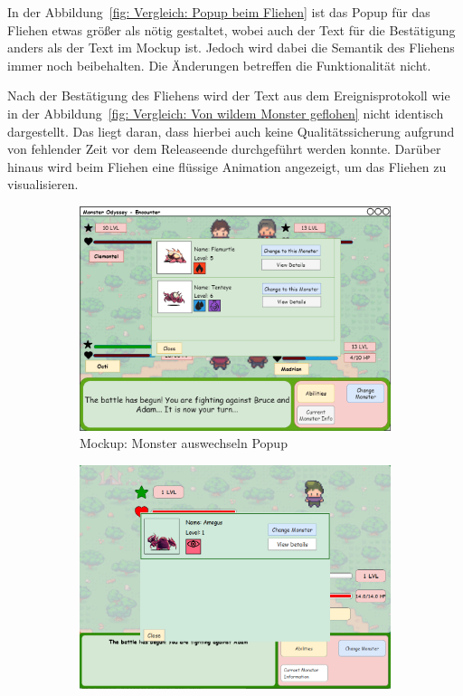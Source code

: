 In der Abbildung~\ref{fig: Vergleich: Popup beim Fliehen} ist das Popup für das Fliehen etwas größer als nötig gestaltet, wobei auch der Text für die Bestätigung anders als der Text im Mockup ist. Jedoch wird dabei die Semantik des Fliehens immer noch beibehalten. Die Änderungen betreffen die Funktionalität nicht.

Nach der Bestätigung des Fliehens wird der Text aus dem Ereignisprotokoll wie in der Abbildung~\ref{fig: Vergleich: Von wildem Monster geflohen} nicht identisch dargestellt. Das liegt daran, dass hierbei auch keine Qualitätssicherung aufgrund von fehlender Zeit vor dem Releaseende durchgeführt werden konnte. Darüber hinaus wird beim Fliehen eine flüssige Animation angezeigt, um das Fliehen zu visualisieren.
\begin{figure}[H]
    \centering
    \begin{subfigure}[b]{0.4\textwidth}
        \includegraphics[width=\textwidth]{images/mockups/Encounter/Encounter2v2ChangeMonsterPopup.png}
        \caption{Mockup: \phantom{wechseln}Monster auswechseln Popup}
        \label{fig: Mockup: Monster auswechseln Popup}
    \end{subfigure}
    \hfill
    \begin{subfigure}[b]{0.4\textwidth}
        \includegraphics[width=\textwidth]{images/implementation/Encounter/monsterwechseln.PNG}

\end{subfigure}
\end{figure}

